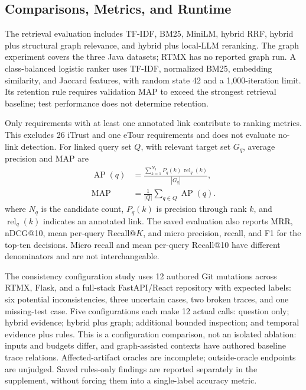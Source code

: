 \documentclass[conference,letterpaper,10pt]{IEEEtran}
\begin{document}
\subsection{Comparisons, Metrics, and Runtime}
The retrieval evaluation includes TF-IDF, BM25, MiniLM, hybrid RRF, hybrid plus structural graph relevance, and hybrid plus local-LLM reranking. The graph experiment covers the three Java datasets; RTMX has no reported graph run. A class-balanced logistic ranker uses TF-IDF, normalized BM25, embedding similarity, and Jaccard features, with random state 42 and a 1,000-iteration limit. Its retention rule requires validation MAP to exceed the strongest retrieval baseline; test performance does not determine retention.

Only requirements with at least one annotated link contribute to ranking metrics. This excludes 26 iTrust and one eTour requirements and does not evaluate no-link detection. For linked query set $Q$, with relevant target set $G_q$, average precision and MAP are
\begin{equation}
 \begin{aligned}
 \operatorname{AP}(q)&=\frac{\sum_{k=1}^{N_q}P_q(k)\,\operatorname{rel}_q(k)}{|G_q|},\\
 \operatorname{MAP}&=\frac{1}{|Q|}\sum_{q\in Q}\operatorname{AP}(q).
 \end{aligned}
\end{equation}
where $N_q$ is the candidate count, $P_q(k)$ is precision through rank $k$, and $\operatorname{rel}_q(k)$ indicates an annotated link. The saved evaluation also reports MRR, nDCG@10, mean per-query Recall@$K$, and micro precision, recall, and F1 for the top-ten decisions. Micro recall and mean per-query Recall@10 have different denominators and are not interchangeable.

The consistency configuration study uses 12 authored Git mutations across RTMX, Flask, and a full-stack FastAPI/React repository with expected labels: six potential inconsistencies, three uncertain cases, two broken traces, and one missing-test case. Five configurations each make 12 actual calls: question only; hybrid evidence; hybrid plus graph; additional bounded inspection; and temporal evidence plus rules. This is a configuration comparison, not an isolated ablation: inputs and budgets differ, and graph-assisted contexts have authored baseline trace relations. Affected-artifact oracles are incomplete; outside-oracle endpoints are unjudged. Saved rules-only findings are reported separately in the supplement, without forcing them into a single-label accuracy metric.
\end{document}
